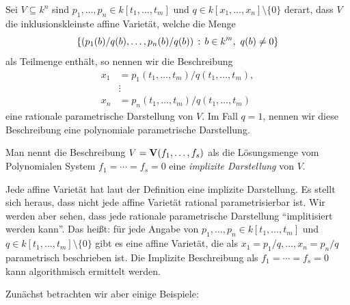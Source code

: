 \documentclass[11pt]{article}
\numberwithin{equation}{section}
\begin{document}
\begin{definition} 
Sei $V \subseteq k^n$ sind $p_1,\ldots,p_n \in k[t_1,\ldots,t_m]$ und $q \in k[x_1,\ldots,x_n] \setminus \{0\}$ derart, dass $V$ die inklusionskleinste affine Varietät, welche die Menge 
\[
	\left\{  (p_1(b)/ q(b),\ldots,p_n(b)/q(b))  \,:\, b \in k^m, \ q(b) \ne 0 \right\}
\]
als Teilmenge enthält, so nennen wir die Beschreibung 
\begin{align*}
	x_1 & = p_1(t_1,\ldots,t_m) / q(t_1,\ldots,t_m), 
	\\ & \vdots 
	\\ x_n & = p_n(t_1,\ldots,t_m) / q(t_1,\ldots,t_m)
\end{align*} 
eine rationale parametrische Darstellung von $V$. Im Fall $q=1$, nennen wir diese Beschreibung eine polynomiale parametrische Darstellung. 
\end{definition} 

\begin{definition} 
Man nennt  die Beschreibung $V = \mathbf{V}(f_1,\ldots,f_s)$ als die Lösungsmenge vom Polynomialen System $f_1 = \cdots  = f_s =0$ eine \emph{implizite Darstellung} von $V$. 
\end{definition} 

Jede affine Varietät hat laut der Definition eine implizite Darstellung. Es stellt sich heraus, dass nicht jede affine Varietät rational parametrisierbar ist. Wir werden aber sehen, dass jede rationale parametrische Darstellung ``implitisiert werden kann''. Das heißt: für jede Angabe von $p_1,\ldots,p_n \in k[t_1,\ldots,t_m]$ und $q \in k[t_1,\ldots,t_m]  \setminus \{0\}$ gibt es eine affine Varietät, die als $x_1 = p_1/q,\ldots, x_n = p_n/q$ parametrisch beschrieben ist. Die Implizite Beschreibung als $f_1 = \cdots = f_s =0$ kann algorithmisch ermittelt werden. 

Zunächst betrachten wir aber einige Beispiele: 
\end{document}
